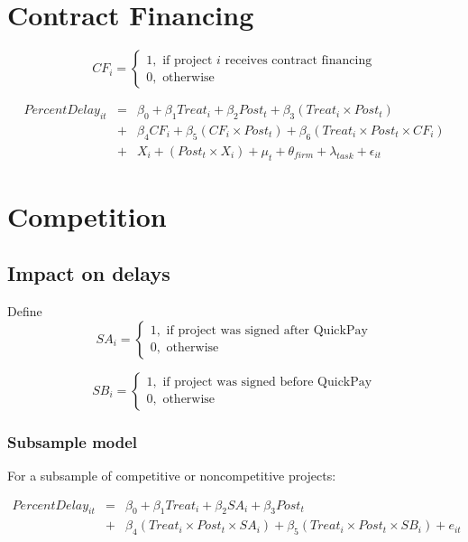 \documentclass[
]{article}
\begin{document}
\hypertarget{contract-financing}{%
\section{Contract Financing}\label{contract-financing}}

\[ CF_i = \begin{cases} 1, \text{ if project } i \text{ receives contract financing}\\
0, \text{ otherwise} \end{cases}\]

\[ \begin{aligned}
PercentDelay_{it} &=& \beta_0+\beta_1 Treat_i + \beta_2 Post_t + \beta_3 (Treat_i \times Post_t) \\
&+&\beta_4 CF_i + \beta_5 (CF_i \times Post_t) + \beta_6 (Treat_i \times Post_t \times CF_i) \\ 
&+&X_i + (Post_t \times X_i) + \mu_t + \theta_{firm} + \lambda_{task}+ \epsilon_{it}
\end{aligned}\]

\hypertarget{competition}{%
\section{Competition}\label{competition}}

\hypertarget{impact-on-delays}{%
\subsection{Impact on delays}\label{impact-on-delays}}

Define
\[ SA_i = \begin{cases} 1, \text{ if project was signed after QuickPay}\\
0, \text{ otherwise} \end{cases}\]

\[ SB_i = \begin{cases} 1, \text{ if project was signed before QuickPay}\\
0, \text{ otherwise} \end{cases}\]

\hypertarget{subsample-model}{%
\subsubsection{Subsample model}\label{subsample-model}}

For a subsample of competitive or noncompetitive projects:

\[ \begin{aligned} PercentDelay_{it} &=& \beta_0 +\beta_1 Treat_i+ \beta_2 SA_i+ \beta_3 Post_t \\&+& \beta_4 (Treat_i \times Post_t \times SA_i )+\beta_5 (Treat_i \times Post_t \times SB_i )+e_{it} \end{aligned} \]
\end{document}
